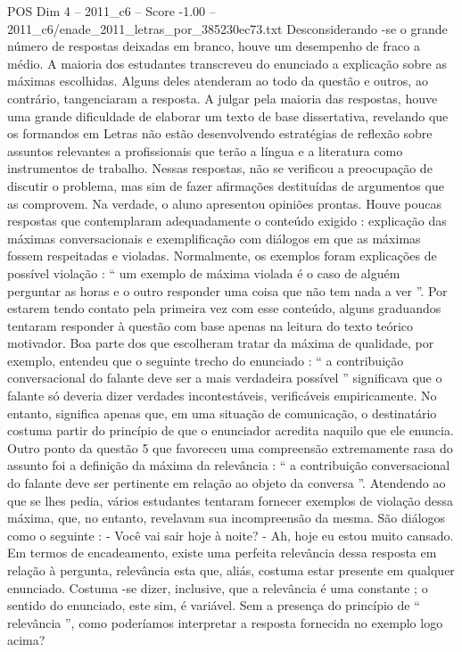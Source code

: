 \begin{textsample}{POS Dim 4 – 2011\_c6 – Score -1.00 – 2011\_c6/enade\_2011\_letras\_por\_385230ec73.txt}
Desconsiderando -se o grande número de respostas deixadas em branco, houve um desempenho de fraco a médio.
A maioria dos estudantes transcreveu do enunciado a explicação sobre as máximas escolhidas.
Alguns deles atenderam ao todo da questão e outros, ao contrário, tangenciaram a resposta.
A julgar pela maioria das respostas, houve uma grande dificuldade de elaborar um texto de base dissertativa, revelando que os formandos em Letras não estão desenvolvendo estratégias de reflexão sobre assuntos relevantes a profissionais que terão a língua e a literatura como instrumentos de trabalho.
Nessas respostas, não se verificou a preocupação de discutir o problema, mas sim de fazer afirmações destituídas de argumentos que as comprovem.
Na verdade, o aluno apresentou opiniões prontas.
Houve poucas respostas que contemplaram adequadamente o conteúdo exigido : explicação das máximas conversacionais e exemplificação com diálogos em que as máximas fossem respeitadas e violadas.
Normalmente, os exemplos foram explicações de possível violação : “ um exemplo de máxima violada é o caso de alguém perguntar as horas e o outro responder uma coisa que não tem nada a ver ”.
Por estarem tendo contato pela primeira vez com esse conteúdo, alguns graduandos tentaram responder à questão com base apenas na leitura do texto teórico motivador.
Boa parte dos que escolheram tratar da máxima de qualidade, por exemplo, entendeu que o seguinte trecho do enunciado : “ a contribuição conversacional do falante deve ser a mais verdadeira possível ” significava que o falante só deveria dizer verdades incontestáveis, verificáveis empiricamente.
No entanto, significa apenas que, em uma situação de comunicação, o destinatário costuma partir do princípio de que o enunciador acredita naquilo que ele enuncia.
Outro ponto da questão 5 que favoreceu uma compreensão extremamente rasa do assunto foi a definição da máxima da relevância : “ a contribuição conversacional do falante deve ser pertinente em relação ao objeto da conversa ”.
Atendendo ao que se lhes pedia, vários estudantes tentaram fornecer exemplos de violação dessa máxima, que, no entanto, revelavam sua incompreensão da mesma.
São diálogos como o seguinte : - Você vai sair hoje à noite? - Ah, hoje eu estou muito cansado.
Em termos de encadeamento, existe uma perfeita relevância dessa resposta em relação à pergunta, relevância esta que, aliás, costuma estar presente em qualquer enunciado.
Costuma -se dizer, inclusive, que a relevância é uma constante ; o sentido do enunciado, este sim, é variável.
Sem a presença do princípio de “ relevância ”, como poderíamos interpretar a resposta fornecida no exemplo logo acima?

\end{textsample}
